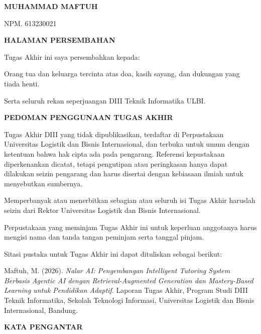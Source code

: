 \documentclass[12pt,a4paper]{article}
\begin{document}
\textbf{MUHAMMAD MAFTUH}



NPM. 613230021



\newpage

\textbf{HALAMAN PERSEMBAHAN}



Tugas Akhir ini saya persembahkan kepada:



Orang tua dan keluarga tercinta atas doa, kasih sayang, dan dukungan yang tiada henti.



Serta seluruh rekan seperjuangan DIII Teknik Informatika ULBI.



\newpage

\textbf{PEDOMAN PENGGUNAAN TUGAS AKHIR}



Tugas Akhir DIII yang tidak dipublikasikan, terdaftar di Perpustakaan Universitas Logistik dan Bisnis Internasional, dan terbuka untuk umum dengan ketentuan bahwa hak cipta ada pada pengarang. Referensi kepustakaan diperkenankan dicatat, tetapi pengutipan atau peringkasan hanya dapat dilakukan seizin pengarang dan harus disertai dengan kebiasaan ilmiah untuk menyebutkan sumbernya.



Memperbanyak atau menerbitkan sebagian atau seluruh isi Tugas Akhir haruslah seizin dari Rektor Universitas Logistik dan Bisnis Internasional.



Perpustakaan yang meminjam Tugas Akhir ini untuk keperluan anggotanya harus mengisi nama dan tanda tangan peminjam serta tanggal pinjam.



Sitasi pustaka untuk Tugas Akhir ini dapat dituliskan sebagai berikut:



Maftuh, M. (2026). \textit{Nalar AI: Pengembangan Intelligent Tutoring System Berbasis Agentic AI dengan Retrieval-Augmented Generation dan Mastery-Based Learning untuk Pendidikan Adaptif}. Laporan Tugas Akhir, Program Studi DIII Teknik Informatika, Sekolah Teknologi Informasi, Universitas Logistik dan Bisnis Internasional, Bandung.



\newpage

\textbf{KATA PENGANTAR}
\end{document}
